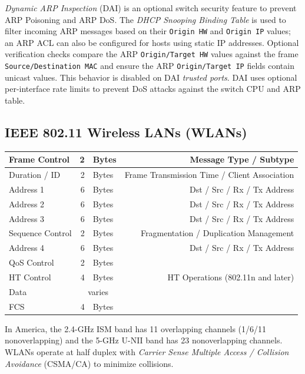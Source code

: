 \documentclass[12pt]{article}
\newcommand{\mc}[3]{\multicolumn{#1}{#2}{#3}}
\begin{document}
	\textit{Dynamic ARP Inspection} (DAI) is an optional switch security feature to prevent ARP Poisoning and ARP DoS. The \textit{DHCP Snooping Binding Table} is used to filter incoming ARP messages based on their \texttt{Origin HW} and \texttt{Origin IP} values; an ARP ACL can also be configured for hosts using static IP addresses. Optional verification checks compare the ARP \texttt{Origin/Target HW} values against the frame \texttt{Source/Destination MAC} and ensure the ARP \texttt{Origin/Target IP} fields contain unicast values. This behavior is disabled on DAI \textit{trusted ports}. DAI uses optional per-interface rate limits to prevent DoS attacks against the switch CPU and ARP table.


	\subsection[IEEE 802.11 WLANs]{IEEE 802.11 Wireless LANs (WLANs) \label{subsec:802.11 WLANS}}
	\begin{table}[H]
	\centering
	\begin{tabular}{| l | r @{ } l | r |}\hline
	Frame Control		& 2	& Bytes		& Message Type / Subtype\\\hline
	Duration / ID		& 2	& Bytes		& Frame Transmission Time / Client Association\\\hline
	Address 1			& 6	& Bytes		& Dst / Src / Rx / Tx Address\\\hline
	Address 2			& 6	& Bytes		& Dst / Src / Rx / Tx Address\\\hline
	Address 3			& 6	& Bytes		& Dst / Src / Rx / Tx Address\\\hline
	Sequence Control		& 2	& Bytes		& Fragmentation / Duplication Management\\\hline
	Address 4			& 6	& Bytes		& Dst / Src / Rx / Tx Address\\\hline
	QoS Control		& 2	& Bytes		& \Cref{sec:QOS}\\\hline
	HT Control			& 4	& Bytes		& HT Operations (802.11n and later)\\\hline
	Data				& \mc{2}{c|}{varies}	&\\\hline
	FCS				& 4	& Bytes		&\\\hline
	\end{tabular}\end{table}
	In America, the 2.4-GHz ISM band has 11 overlapping channels (1/6/11 nonoverlapping) and the 5-GHz U-NII band has 23 nonoverlapping channels. WLANs operate at half duplex with \textit{Carrier Sense Multiple Access / Collision Avoidance} (CSMA/CA) to minimize collisions.
	
\end{document}
